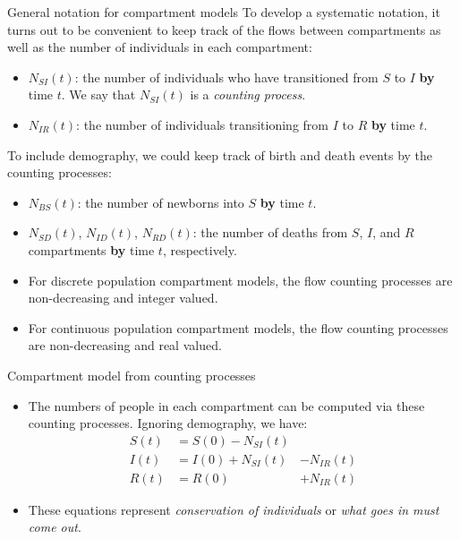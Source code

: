 \documentclass[
  ignorenonframetext,
  aspectratio=169,
  t]{beamer}
\providecommand{\tightlist}{%
  \setlength{\itemsep}{0pt}\setlength{\parskip}{0pt}}\usepackage{longtable,booktabs,array}
\theoremstyle{definition}
\begin{document}
\begin{frame}[allowframebreaks]{General notation for compartment models}
\label{general-notation-for-compartment-models}
To develop a systematic notation, it turns out to be convenient to keep
track of the flows between compartments as well as the number of
individuals in each compartment:

\begin{itemize}
\item
  \(N_{SI}(t)\): the number of individuals who have transitioned from
  \(S\) to \(I\) \textbf{by} time \(t\). We say that \(N_{SI}(t)\) is a
  \emph{counting process}.
\item
  \(N_{IR}(t)\): the number of individuals transitioning from \(I\) to
  \(R\) \textbf{by} time \(t\).
\end{itemize}

To include demography, we could keep track of birth and death events by
the counting processes:

\begin{itemize}
\item
  \(N_{BS}(t)\): the number of newborns into \(S\) \textbf{by} time
  \(t\).
\item
  \(N_{SD}(t)\), \(N_{ID}(t)\), \(N_{RD}(t)\): the number of deaths from
  \(S\), \(I\), and \(R\) compartments \textbf{by} time \(t\),
  respectively.
\end{itemize}

\framebreak

\begin{itemize}
\tightlist
\item
  For discrete population compartment models, the flow counting
  processes are non-decreasing and integer valued.
\item
  For continuous population compartment models, the flow counting
  processes are non-decreasing and real valued.
\end{itemize}
\end{frame}

\begin{frame}{Compartment model from counting processes}
\label{compartment-model-from-counting-processes}
\begin{itemize}
\item
  The numbers of people in each compartment can be computed via these
  counting processes. Ignoring demography, we have: \begin{equation*}
   \begin{aligned}
     S(t) &= S(0) - N_{SI}(t) &\\
     I(t) &= I(0) + N_{SI}(t) &- N_{IR}(t) \\
     R(t) &= R(0) &+ N_{IR}(t)
   \end{aligned}
      \end{equation*}
\item
  These equations represent \emph{conservation of individuals} or
  \emph{what goes in must come out}.
\end{itemize}
\end{frame}
\end{document}
